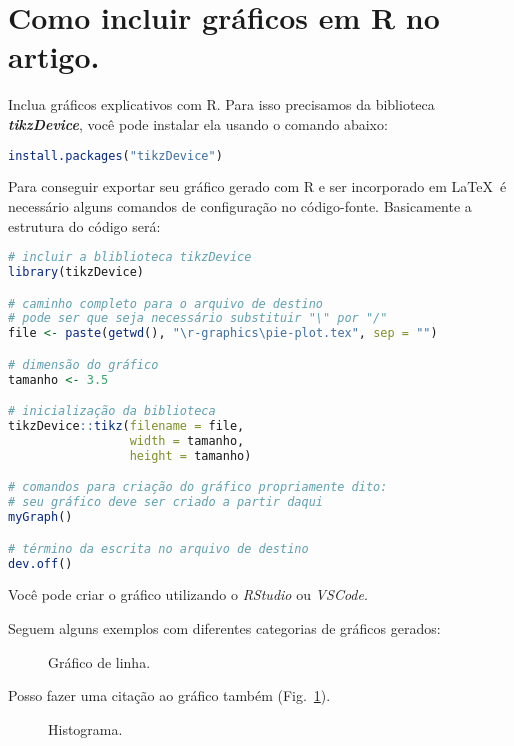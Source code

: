 \section{Como incluir gráficos em R no artigo.}

Inclua gráficos explicativos com R. Para isso precisamos da biblioteca \textit{\textbf{tikzDevice}}, você pode instalar ela usando o comando abaixo:

\begin{lstlisting}[language=R]
install.packages("tikzDevice")
\end{lstlisting}

Para conseguir exportar seu gráfico gerado com R e ser incorporado em \LaTeX\ é necessário alguns comandos de configuração no código-fonte. Basicamente a estrutura do código será:

\begin{lstlisting}[language=R]
# incluir a bliblioteca tikzDevice
library(tikzDevice)

# caminho completo para o arquivo de destino
# pode ser que seja necessário substituir "\" por "/"
file <- paste(getwd(), "\r-graphics\pie-plot.tex", sep = "")

# dimensão do gráfico
tamanho <- 3.5

# inicialização da biblioteca 
tikzDevice::tikz(filename = file,
                 width = tamanho,
                 height = tamanho)

# comandos para criação do gráfico propriamente dito:
# seu gráfico deve ser criado a partir daqui
myGraph()

# término da escrita no arquivo de destino
dev.off()
\end{lstlisting}

Você pode criar o gráfico utilizando o \textit{RStudio} ou \textit{VSCode}.

Seguem alguns exemplos com diferentes categorias de gráficos gerados:

\begin{figure}[H]
    \centering
    
    \caption{Gráfico de linha.}
    \label{graph:linha}
\end{figure}


Posso fazer uma citação ao gráfico também (Fig.~\ref{graph:linha}).

\begin{figure}[H]
    \centering
    
    \caption{Histograma.}
    \label{graph:histograma}
\end{figure}


